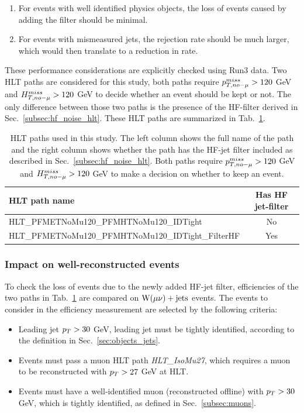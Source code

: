 \begin{enumerate}
    \item For events with well identified physics objects, the loss of events caused by adding the filter should be minimal.
    \item For events with mismeasured jets, the rejection rate should be much larger, which would then translate to a reduction in rate.
\end{enumerate}

These performance considerations are explicitly checked using Run3 data. 
Two HLT paths are considered for this study, both paths require $p_{T,no-\mu}^{miss} > 120$ GeV and $H_{T,no-\mu}^{miss} > 120$ GeV
to decide whether an event should be kept or not. The only difference between those two paths is the presence of the HF-filter derived in Sec.~\ref{subsec:hf_noise_hlt}.
These HLT paths are summarized in Tab.~\ref{tab:hlt_met_paths}.

\begin{table}[h!]
    \centering
    \caption{HLT paths used in this study. The left column shows the full name of the path and the right column shows whether the path has
    the HF-jet filter included as described in Sec.~\ref{subsec:hf_noise_hlt}. Both paths require $p_{T,no-\mu}^{miss} > 120$ GeV and $H_{T,no-\mu}^{miss} > 120$ GeV
    to make a decision on whether to keep an event.}
    \label{tab:hlt_met_paths}
    \def\arraystretch{1.05}
    \begin{tabular}{l c}
        \hline
        HLT path name & Has HF jet-filter \\
        \hline
        HLT\_PFMETNoMu120\_PFMHTNoMu120\_IDTight           & No \\
        HLT\_PFMETNoMu120\_PFMHTNoMu120\_IDTight\_FilterHF & Yes \\
    \end{tabular}
\end{table}

\subsubsection{Impact on well-reconstructed events}

To check the loss of events due to the newly added HF-jet filter, efficiencies of the two paths in Tab.~\ref{tab:hlt_met_paths} are compared
on $\mathrm{W}(\mu\nu)+\textrm{jets}$ events. The events to consider in the efficiency measurement are selected by the following criteria:

\begin{itemize}
    \item Leading jet $p_T > 30$ GeV, leading jet must be tightly identified, according to the definition in Sec.~\ref{sec:objects_jets}.
    \item Events must pass a muon HLT path \textit{HLT\_IsoMu27}, which requires a muon to be reconstructed with $p_T > 27$ GeV at HLT.
    \item Events must have a well-identified muon (reconstructed offline) with $p_T > 30$ GeV, which is tightly identified, as defined in Sec.~\ref{subsec:muons}.
\end{itemize}

